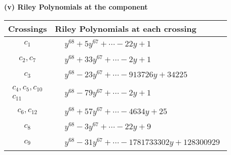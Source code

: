 \documentclass[1p]{elsarticle_modified}
\theoremstyle{definition}
\begin{document}
\newpage\renewcommand{\arraystretch}{1}
\flushleft \textbf{(v) Riley Polynomials at the component}\newline \\
\begin{tabular}{m{50pt}|m{274pt}}
Crossings & \hspace{64pt}Riley Polynomials at each crossing \\
\hline $$\begin{aligned}c_{1}\end{aligned}$$&$\begin{aligned}
&y^{68}+5 y^{67}+\cdots-22 y+1
\end{aligned}$\\
\hline $$\begin{aligned}c_{2},c_{7}\end{aligned}$$&$\begin{aligned}
&y^{68}+33 y^{67}+\cdots-2 y+1
\end{aligned}$\\
\hline $$\begin{aligned}c_{3}\end{aligned}$$&$\begin{aligned}
&y^{68}-23 y^{67}+\cdots-913726 y+34225
\end{aligned}$\\
\hline $$\begin{aligned}c_{4},c_{5},c_{10}\\c_{11}\end{aligned}$$&$\begin{aligned}
&y^{68}-79 y^{67}+\cdots-2 y+1
\end{aligned}$\\
\hline $$\begin{aligned}c_{6},c_{12}\end{aligned}$$&$\begin{aligned}
&y^{68}+57 y^{67}+\cdots-4634 y+25
\end{aligned}$\\
\hline $$\begin{aligned}c_{8}\end{aligned}$$&$\begin{aligned}
&y^{68}-3 y^{67}+\cdots-22 y+9
\end{aligned}$\\
\hline $$\begin{aligned}c_{9}\end{aligned}$$&$\begin{aligned}
&y^{68}-31 y^{67}+\cdots-1781733302 y+128300929
\end{aligned}$\\
\hline
\end{tabular}\\~\\
\end{document}
